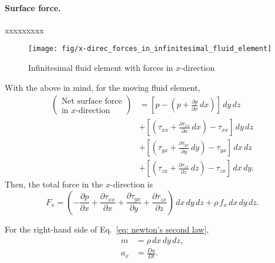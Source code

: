\paragraph{Surface force. }
xxxxxxxxx

\begin{figure}[h!]
    \raggedleft
    \texttt{[image: fig/x-direc\_forces\_in\_infinitesimal\_fluid\_element]}
    \caption{Infinitesimal fluid element with forces in $x$-direction}
    \label{fig: infinitesimal fluid element with forces in x-direction}
\end{figure}

With the above in mind, for the moving fluid element, 
\begin{equation}
\begin{aligned}
    \left(\substack{\text{Net surface force} \\
                    \text{in }x\text{-direction}} \right)
    &= \left[
        p- \left( 
            p+\frac{\partial p}{\partial x}\, dx 
            \right)
        \right] \, dy\,dz \\
    &+ \left[
            \left( 
                \tau_{xx}
                +\frac{\partial \tau_{xx}}{\partial x}\, dx 
            \right)
            - \tau_{xx}
        \right] \, dy\,dz \\
    &+ \left[
            \left( 
                \tau_{yx}
                +\frac{\partial \tau_{yx}}{\partial y}\, dy 
            \right)
            - \tau_{yx}
        \right] \, dx\,dz \\
    &+ \left[
            \left( 
                \tau_{zx}
                +\frac{\partial \tau_{zx}}{\partial z}\, dz 
            \right)
            - \tau_{zx}
        \right] \, dx\,dy. 
\end{aligned}
\end{equation}
Then, the total force in the $x$-direction is 
\begin{equation}
    F_x = \left(
        -\frac{\partial p}{\partial x} 
        +\frac{\partial \tau_{xx}}{\partial x}
        +\frac{\partial \tau_{yx}}{\partial y}
        +\frac{\partial \tau_{zx}}{\partial z}
    \right) \, dx\,dy\,dz
    + \rho\, f_x\, dx\,dy\,dz. 
\end{equation}

For the right-hand side of Eq.~\eqref{eq: newton's second law}, 
\begin{equation}
\begin{aligned}
    m &= \rho \, dx\,dy\,dz, \\
    a_x &= \frac{Du}{Dt}. 
\end{aligned}
\end{equation}

